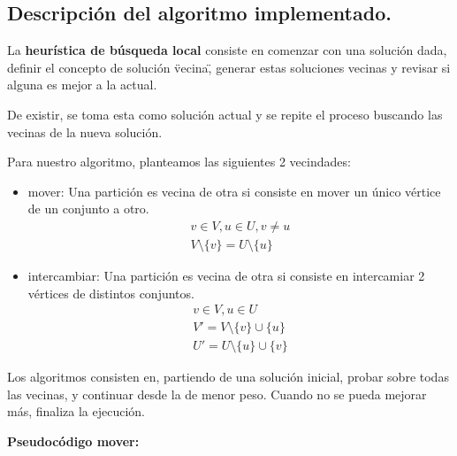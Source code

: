 \subsection{Descripción del algoritmo implementado.}
\vspace*{0.3cm}

La \textbf{heurística de búsqueda local} consiste en comenzar con una
solución dada, definir el concepto de solución \"vecina\", generar estas
soluciones vecinas y revisar si alguna es mejor a la actual.

De existir, se toma esta como solución actual y se repite el proceso
buscando las vecinas de la nueva solución.

\vspace*{0.3cm}

Para nuestro algoritmo, planteamos las siguientes 2 vecindades:

\begin{itemize}
    \item mover: Una partición es vecina de otra si consiste en mover un único vértice de un conjunto a otro.
    \begin{align*}
        v \in V, u \in U, v \ne u \\
        V \setminus \{v\} = U \setminus \{u\}
    \end{align*}

    \item intercambiar: Una partición es vecina de otra si consiste en intercamiar 2 vértices de distintos conjuntos.
    \begin{align*}
        v \in V, u \in U \\
        V' = V \setminus \{v\} \cup \{u\} \\
        U' = U \setminus \{u\} \cup \{v\}
    \end{align*}
\end{itemize}

Los algoritmos consisten en, partiendo de una solución inicial, probar sobre todas las vecinas, y continuar desde la de menor peso. Cuando no se pueda mejorar más, finaliza la ejecución.

\vspace*{0.5cm}

\textbf{Pseudocódigo mover:}

\vspace*{0.3cm}

